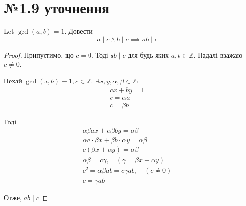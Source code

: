 \documentclass[11pt, a4paper]{article} %
\newcommand{\Z}{\mathbb{Z}}
\begin{document}
\section*{№1.9 уточнення}
\begin{mdframed}
    Let $\gcd(a,b)=1$.
    Довести
    \[a\mid c \land b\mid c \implies ab\mid c\]
\end{mdframed}

\begin{proof}
    Припустимо, що $c=0$. Тоді $ab \mid c$ для будь яких $a,b\in\Z$. 
    Надалі вважаю $c\ne 0$.

    Нехай $\gcd(a,b) = 1, c\in\Z$. $\exists x,y,\alpha,\beta\in\Z:$
    \begin{gather*}
        ax+by=1\\
        c=\alpha a\\
        c=\beta b
    \end{gather*}

    Тоді
    \begin{gather*}
        \alpha\beta ax + \alpha\beta by = \alpha\beta\\
        \alpha a\cdot \beta x + \beta b \cdot \alpha y = \alpha\beta\\
        c(\beta x + \alpha y) = \alpha\beta\\
        \alpha\beta = c\gamma, \quad (\gamma = \beta x + \alpha y)\\
        c^2 = \alpha\beta ab = c \gamma ab, \quad (c\ne 0)\\
        c = \gamma ab
    \end{gather*}

    Отже, $ab\mid c$

\end{proof}
\end{document}
